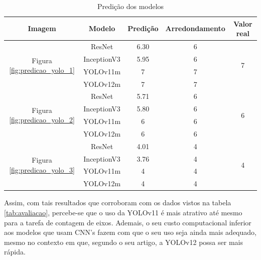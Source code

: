         \begin{table} [!htb]
            \centering
            \begin{tabular}{| c | c | c | c | c |}
            \hline
            Imagem               & Modelo      & Predição & Arredondamento & Valor real          \\
            \hline
            \multirow{4}{*}{Figura \ref{fig:predicao_yolo_1}} & ResNet      & 6.30     & 6              & \multirow{4}{*}{7}  \\
                                 & InceptionV3 & 5.95     & 6              &                     \\
                                 & YOLOv11m    & 7        & 7              &                     \\
                                 & YOLOv12m    & 7        & 7              &                     \\
            \hline
            \multirow{4}{*}{Figura \ref{fig:predicao_yolo_2}}   & ResNet      & 5.71     & 6              & \multirow{4}{*}{6}  \\
                                 & InceptionV3 & 5.80     & 6              &                     \\
                                 & YOLOv11m    & 6        & 6              &                     \\
                                 & YOLOv12m    & 6        & 6              &                     \\
            \hline
            \multirow{4}{*}{Figura \ref{fig:predicao_yolo_3}}   & ResNet      & 4.01     & 4              & \multirow{4}{*}{4}  \\
                                 & InceptionV3 & 3.76     & 4              &                     \\
                                 & YOLOv11m    & 4        & 4              &                     \\      & YOLOv12m    & 4        & 4              &                     \\                    
            \hline
            \end{tabular}
            \caption{Predição dos modelos}
            \label{tab:predicao}
        \end{table}

        Assim, com tais resultados que corroboram com os dados vistos na tabela \ref{tab:avaliacao}, percebe-se que o uso da YOLOv11 é mais atrativo até mesmo para a tarefa de contagem de eixos. Ademais, o seu custo computacional inferior aos modelos que usam CNN's fazem com que o seu uso seja ainda mais adequado, mesmo no contexto em que, segundo o seu artigo, a YOLOv12 possa ser mais rápida.
            

